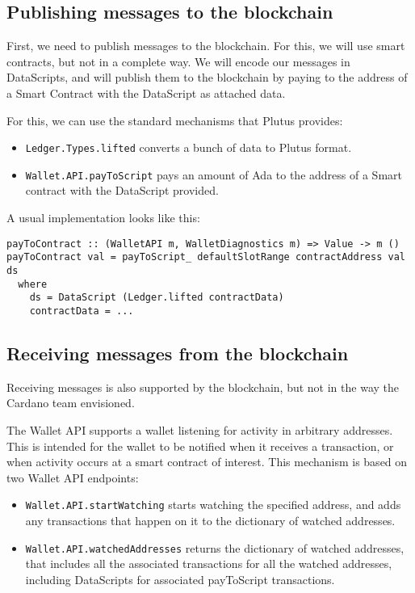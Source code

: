 \documentclass{article}
\begin{document}
\subsection{Publishing messages to the blockchain}
First, we need to publish messages to the blockchain. For this, we will use smart contracts, but not in a complete way. We will encode our messages in DataScripts, and will publish them to the blockchain by paying to the address of a Smart Contract with the DataScript as attached data.

For this, we can use the standard mechanisms that Plutus provides:

\begin{itemize}
\item \verb|Ledger.Types.lifted| converts a bunch of data to Plutus format.
\item \verb|Wallet.API.payToScript| pays an amount of Ada to the address of a Smart contract with the DataScript provided.
\end{itemize}

A usual implementation looks like this:
\nopagebreak
\begin{verbatim}
payToContract :: (WalletAPI m, WalletDiagnostics m) => Value -> m ()
payToContract val = payToScript_ defaultSlotRange contractAddress val ds
  where
    ds = DataScript (Ledger.lifted contractData)
    contractData = ...
\end{verbatim}

\subsection{Receiving messages from the blockchain}
Receiving messages is also supported by the blockchain, but not in the way the Cardano team envisioned.

The Wallet API supports a wallet listening for activity in arbitrary addresses. This is intended for the wallet to be notified when it receives a transaction, or when activity occurs at a smart contract of interest. This mechanism is based on two Wallet API endpoints:
\nopagebreak
\begin{itemize}
\item \verb|Wallet.API.startWatching| starts watching the specified address, and adds any transactions that happen on it to the dictionary of watched addresses.
\item \verb|Wallet.API.watchedAddresses| returns the dictionary of watched addresses, that includes all the associated transactions for all the watched addresses, including DataScripts for associated payToScript transactions.
\end{itemize}
\end{document}

